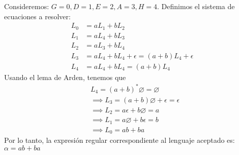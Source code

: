 \documentclass{article}
\begin{document}
\begin{enumerate}
{\begin{enumerate}
{            Consideremos: $G = 0, D = 1, E = 2, A = 3, H = 4$.
            Definimos el sistema de ecuaciones a resolver:
            \begin{align*}
                L_{0} &= aL_{1} + bL_{2}\\
                L_{1} &= aL_{4} + bL_{3}\\
                L_{2} &= aL_{3} + bL_{4}\\
                L_{3} &= aL_{4} + bL_{4} + \epsilon = (a+b)L_{4}+\epsilon\\
                L_{4} &= aL_{4} + bL_{4} = (a+b)L_{4}
            \end{align*}
            Usando el lema de Arden, tenemos que 
            \begin{align*}
                &L_{4} = (a+b)^{*} \varnothing = \varnothing\\
                &\implies L_{3} = (a+b)\varnothing + \epsilon = \epsilon\\
                &\implies L_{2} = a\epsilon + b\varnothing = a\\
                &\implies L_{1} = a\varnothing + b\epsilon = b\\
                &\implies L_{0} = ab + ba
            \end{align*}
            }
            Por lo tanto, la expresión regular correspondiente al lenguaje 
            aceptado es: $\alpha = ab + ba$
            \end{enumerate}
    	}
    \end{enumerate}
\end{document}
